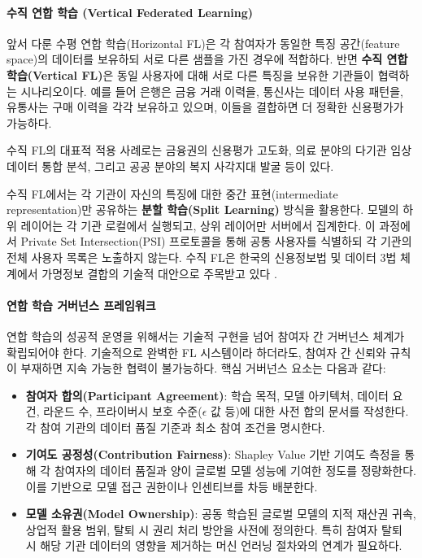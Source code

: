 \paragraph{수직 연합 학습 (Vertical Federated Learning)}

앞서 다룬 수평 연합 학습(Horizontal FL)은 각 참여자가 동일한 특징 공간(feature space)의 데이터를 보유하되 서로 다른 샘플을 가진 경우에 적합하다. 반면 \textbf{수직 연합 학습(Vertical FL)}은 동일 사용자에 대해 서로 다른 특징을 보유한 기관들이 협력하는 시나리오이다. 예를 들어 은행은 금융 거래 이력을, 통신사는 데이터 사용 패턴을, 유통사는 구매 이력을 각각 보유하고 있으며, 이들을 결합하면 더 정확한 신용평가가 가능하다.

수직 FL의 대표적 적용 사례로는 금융권의 신용평가 고도화, 의료 분야의 다기관 임상 데이터 통합 분석, 그리고 공공 분야의 복지 사각지대 발굴 등이 있다.

수직 FL에서는 각 기관이 자신의 특징에 대한 중간 표현(intermediate representation)만 공유하는 \textbf{분할 학습(Split Learning)} 방식을 활용한다. 모델의 하위 레이어는 각 기관 로컬에서 실행되고, 상위 레이어만 서버에서 집계한다. 이 과정에서 Private Set Intersection(PSI) 프로토콜을 통해 공통 사용자를 식별하되 각 기관의 전체 사용자 목록은 노출하지 않는다. 수직 FL은 한국의 신용정보법 및 데이터 3법 체계에서 가명정보 결합의 기술적 대안으로 주목받고 있다 \cite{oecd2024regulatory_ai_finance}.

\paragraph{연합 학습 거버넌스 프레임워크}

연합 학습의 성공적 운영을 위해서는 기술적 구현을 넘어 참여자 간 거버넌스 체계가 확립되어야 한다. 기술적으로 완벽한 FL 시스템이라 하더라도, 참여자 간 신뢰와 규칙이 부재하면 지속 가능한 협력이 불가능하다. 핵심 거버넌스 요소는 다음과 같다:

\begin{itemize}
    \item \textbf{참여자 합의(Participant Agreement)}: 학습 목적, 모델 아키텍처, 데이터 요건, 라운드 수, 프라이버시 보호 수준($\epsilon$ 값 등)에 대한 사전 합의 문서를 작성한다. 각 참여 기관의 데이터 품질 기준과 최소 참여 조건을 명시한다.
    \item \textbf{기여도 공정성(Contribution Fairness)}: Shapley Value 기반 기여도 측정을 통해 각 참여자의 데이터 품질과 양이 글로벌 모델 성능에 기여한 정도를 정량화한다. 이를 기반으로 모델 접근 권한이나 인센티브를 차등 배분한다.
    \item \textbf{모델 소유권(Model Ownership)}: 공동 학습된 글로벌 모델의 지적 재산권 귀속, 상업적 활용 범위, 탈퇴 시 권리 처리 방안을 사전에 정의한다. 특히 참여자 탈퇴 시 해당 기관 데이터의 영향을 제거하는 머신 언러닝 절차와의 연계가 필요하다.
\end{itemize}

